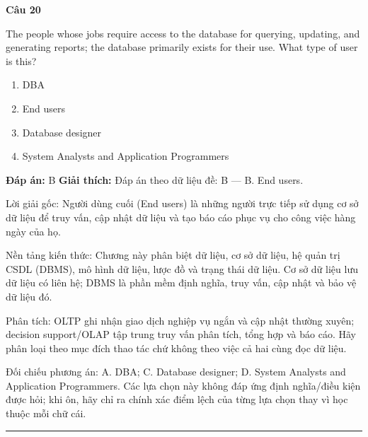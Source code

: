 \documentclass[11pt,a4paper]{article}
\newenvironment{question}[1]{%
  \par\vspace{1em}\noindent\textbf{\large Câu #1}\par\vspace{0.4em}
}{%
  \par\vspace{1em}\hrule\vspace{0.6em}
}
\newenvironment{choices}{%
  \begin{enumerate}[label=\textbf{\Alph*.},leftmargin=2.2em,itemsep=2pt,topsep=3pt]
}{%
  \end{enumerate}
}
\newcommand{\choice}{\item}
\begin{document}
\begin{question}{20}
The people whose jobs require access to the database for querying, updating, and generating reports; the database primarily exists for their use. What type of user is this?
\begin{choices}
\choice DBA
\choice End users
\choice Database designer
\choice System Analysts and Application Programmers
\end{choices}
\textbf{Đáp án:} B
\textbf{Giải thích:} Đáp án theo dữ liệu đề: B — B. End users.

Lời giải gốc: Người dùng cuối (End users) là những người trực tiếp sử dụng cơ sở dữ liệu để truy vấn, cập nhật dữ liệu và tạo báo cáo phục vụ cho công việc hàng ngày của họ.

Nền tảng kiến thức: Chương này phân biệt dữ liệu, cơ sở dữ liệu, hệ quản trị CSDL (DBMS), mô hình dữ liệu, lược đồ và trạng thái dữ liệu. Cơ sở dữ liệu lưu dữ liệu có liên hệ; DBMS là phần mềm định nghĩa, truy vấn, cập nhật và bảo vệ dữ liệu đó.

Phân tích: OLTP ghi nhận giao dịch nghiệp vụ ngắn và cập nhật thường xuyên; decision support/OLAP tập trung truy vấn phân tích, tổng hợp và báo cáo. Hãy phân loại theo mục đích thao tác chứ không theo việc cả hai cùng đọc dữ liệu.

Đối chiếu phương án: A. DBA; C. Database designer; D. System Analysts and Application Programmers. Các lựa chọn này không đáp ứng định nghĩa/điều kiện được hỏi; khi ôn, hãy chỉ ra chính xác điểm lệch của từng lựa chọn thay vì học thuộc mỗi chữ cái.
\end{question}
\end{document}
